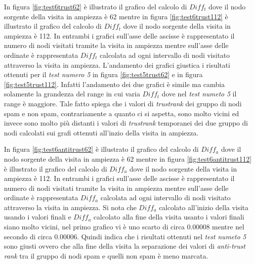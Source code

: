 In figura \ref{fig:test6trust62} è illustrato il grafico del calcolo di \(Diff_t\) dove il nodo sorgente della visita in ampiezza è 62 mentre in figura \ref{fig:test6trust112} è illustrato il grafico del calcolo di \(Diff_t\) dove il nodo sorgente della visita in ampiezza è 112. In entrambi i grafici sull'asse delle ascisse è rappresentato il numero di nodi visitati tramite la visita in ampiezza mentre sull'asse delle ordinate è rappresentata \(Diff_t\) calcolata ad ogni intervallo di nodi visitato attraverso la visita in ampiezza. L'andamento dei grafici giustica i risultati ottenuti per il \textit{test numero 5} in figura \ref{fig:test5trust62} e in figura \ref{fig:test5trust112}. Infatti l'andamento dei due grafici è simile ma cambia solamente la grandezza del range in cui varia \(Diff_t\) dove nel \textit{test numeto 5} il range è maggiore. Tale fatto spiega che i valori di \textit{trustrank} dei gruppo di nodi spam e non spam, contrariamente a quanto ci si aspetta, sono molto vicini ed invece sono molto 
più distanti i valori di \textit{trustrank} temporanei dei due gruppo di nodi calcolati sui grafi ottenuti all'inzio della visita in ampiezza. 
 
In figura \ref{fig:test6antitrust62}  è illustrato il grafico del calcolo di \(Diff_a\) dove il nodo sorgente della visita in ampiezza è 62 mentre in figura \ref{fig:test6antitrust112} è illustrato il grafico del calcolo di \(Diff_a\) dove il nodo sorgente della visita in ampiezza è 112. In entrambi i grafici sull'asse delle ascisse è rappresentato il numero di nodi visitati tramite la visita in ampiezza mentre sull'asse delle ordinate è rappresentata \(Diff_a\) calcolata ad ogni intervallo di nodi visitato attraverso la visita in ampiezza. Si nota che \(Diff_a\) calcolato all'inizio della visita usando i valori finali e \(Diff_a\) calcolato alla fine della visita usanto i valori finali siano molto vicini, nel primo grafico vi è uno  scarto di circa 0.00008 mentre nel secondo di circa 0.00006. Quindi indica che i risultati ottenuti nel \textit{test numeto 5} sono giusti ovvero che alla fine della visita la separazione dei valori di \textit{anti-trust rank} tra il gruppo di nodi spam e quelli non spam è meno 
marcata.

